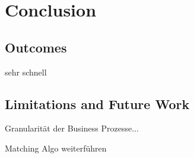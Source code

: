 \chapter{Conclusion}
\label{ch:Conclusion}

\section{Outcomes}

sehr schnell

\section{Limitations and Future Work}
Granularität der Business Prozesse...


Matching Algo weiterführen